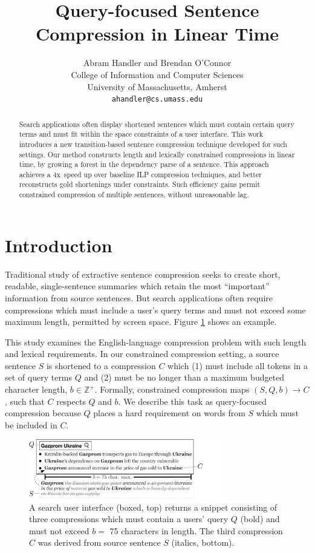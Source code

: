 \documentclass[11pt,a4paper]{article}
\title{Query-focused Sentence Compression in Linear Time}
\author{Abram Handler {\normalfont and} Brendan O'Connor \\
  College of Information and Computer Sciences \\
  University of Massachusetts, Amherst \\
  {\tt ahandler@cs.umass.edu}  \\}
\date{}
\newcommand{\speedup}[0]{4x~}
\begin{document}
\maketitle

\begin{abstract}
Search applications often display shortened sentences which must contain certain query terms and must fit within the space constraints of a user interface. This work introduces a new transition-based sentence compression technique developed for such settings. Our method constructs length and lexically constrained compressions in linear time, by growing a forest in the dependency parse of a sentence. This approach achieves a \speedup speed up over baseline ILP compression techniques, and better reconstructs gold shortenings under constraints. Such efficiency gains permit constrained compression of multiple sentences, without unreasonable lag.
\end{abstract}


\section{Introduction}\label{s:intro}

Traditional study of extractive sentence compression seeks to create short, readable, single-sentence summaries which retain the most ``important'' information from source sentences. But search applications often require compressions which must include a user's query terms and must not exceed some maximum length, permitted by screen space.  Figure \ref{f:qf} shows an example.

This study examines the English-language compression problem with such length and lexical requirements. In our constrained compression setting, a source sentence $S$ is shortened to a compression $C$ which (1) must include all tokens in a set of query terms $Q$ and (2) must be no longer than a maximum budgeted character length, $b \in \mathbb{Z}^{+}$. Formally, constrained compression maps $(S,Q,b) \rightarrow C$, such that $C$ respects $Q$ and $b$. We describe this task as query-focused compression because $Q$ places a hard requirement on words from $S$ which must be included in $C$.

\begin{figure}[htb!]
\includegraphics[width=8.5cm]{qf.pdf}
\caption{A search user interface (boxed, top) returns a snippet consisting of three compressions which must contain a users' query $Q$ (bold) and must not exceed $b=$ 75 characters in length. The third compression $C$ was derived from source sentence $S$ (italics, bottom).}
\label{f:qf}
\end{figure}
\end{document}
